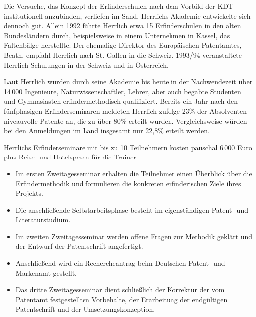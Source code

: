 \documentclass[11pt,a4paper]{article}
\begin{document}
Die Versuche, das Konzept der Erfinderschulen nach dem Vorbild der KDT
institutionell anzubinden, verliefen im Sand. Herrlichs Akademie entwickelte
sich dennoch gut. Allein 1992 führte Herrlich etwa 15 Erfinderschulen in den
alten Bundesländern durch, beispielsweise in einem Unternehmen in Kassel, das
Faltenbälge herstellte. Der ehemalige Direktor des Europäischen Patentamtes,
Beath, empfahl Herrlich nach St. Gallen in die Schweiz. 1993/94 veranstaltete
Herrlich Schulungen in der Schweiz und in Österreich.

Laut Herrlich wurden durch seine Akademie bis heute in der Nachwendezeit über
14\,000 Ingenieure, Naturwissenschaftler, Lehrer, aber auch begabte Studenten
und Gymnasiasten erfindermethodisch qualifiziert. Bereits ein Jahr nach den
fünfphasigen Erfinderseminaren meldeten Herrlich zufolge 23\% der Absolventen
niveauvolle Patente an, die zu über 80\% erteilt wurden. Vergleichsweise
würden bei den Anmeldungen im Land insgesamt nur 22,8\% erteilt
werden.

Herrlichs Erfinderseminare mit bis zu 10 Teilnehmern kosten pauschal 6\,000
Euro plus Reise- und Hotelspesen für die Trainer.
\begin{itemize}\itemsep0pt
\item 
Im ersten Zweitagesseminar erhalten die Teilnehmer einen Überblick über die
Erfindermethodik und formulieren die konkreten erfinderischen Ziele ihres
Projekts.
\item 
Die anschließende Selbstarbeitsphase besteht im eigenständigen Patent- und
Literaturstudium.
\item 
Im zweiten Zweitagesseminar werden offene Fragen zur Methodik geklärt und der
Entwurf der Patentschrift angefertigt.
\item 
Anschließend wird ein Rechercheantrag beim Deutschen Patent- und Markenamt
gestellt.
\item 
Das dritte Zweitagesseminar dient schließlich der Korrektur der vom Patentamt
festgestellten Vorbehalte, der Erarbeitung der endgültigen Patentschrift und
der Umsetzungskonzeption.
\end{itemize}


\ccnotice
\end{document}
